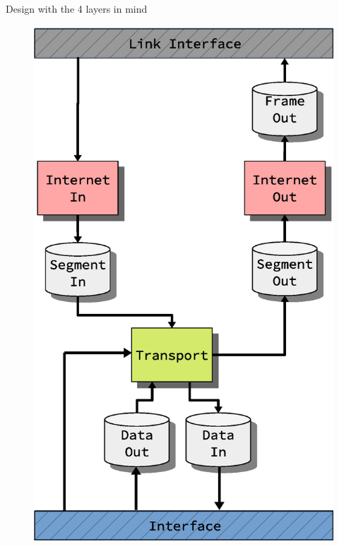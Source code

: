 \begin{frame}
Design with the 4 layers in mind
\begin{figure}
	\centering
\includegraphics[scale=0.3]{./background/design_2.eps}
\end{figure}
\end{frame}




